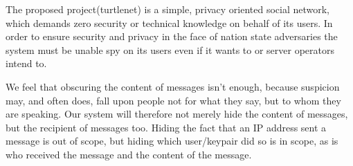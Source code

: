 The proposed project(turtlenet) is a simple, privacy oriented social
network, which demands zero security or technical knowledge on behalf of its
users. In order to ensure security and privacy in the face of nation state
adversaries the system must be unable spy on its users even if it wants to or
server operators intend to.

We feel that obscuring the content of messages isn't enough, because suspicion
may, and often does, fall upon people not for what they say, but to whom they
are speaking. Our system will therefore not merely hide
the content of messages, but the recipient of messages too. Hiding the fact that
an IP address sent a message is out of scope, but hiding which user/keypair did
so is in scope, as is who received the message and the content of the message.
